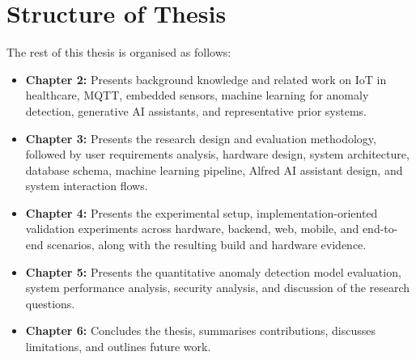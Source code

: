 \section{Structure of Thesis}

The rest of this thesis is organised as follows:

\begin{itemize}
    \item \textbf{Chapter 2:} Presents background knowledge and related work on IoT in healthcare, MQTT, embedded sensors, machine learning for anomaly detection, generative AI assistants, and representative prior systems.

    \item \textbf{Chapter 3:} Presents the research design and evaluation methodology, followed by user requirements analysis, hardware design, system architecture, database schema, machine learning pipeline, Alfred AI assistant design, and system interaction flows.

    \item \textbf{Chapter 4:} Presents the experimental setup, implementation-oriented validation experiments across hardware, backend, web, mobile, and end-to-end scenarios, along with the resulting build and hardware evidence.

    \item \textbf{Chapter 5:} Presents the quantitative anomaly detection model evaluation, system performance analysis, security analysis, and discussion of the research questions.

    \item \textbf{Chapter 6:} Concludes the thesis, summarises contributions, discusses limitations, and outlines future work.
\end{itemize}
